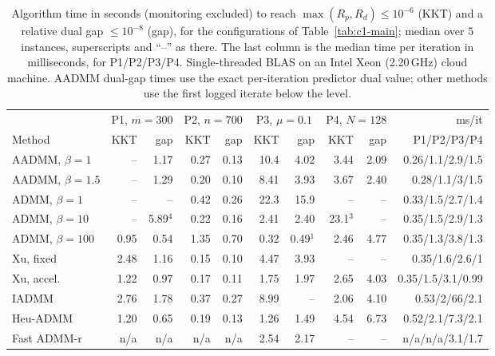 \begin{table}[htbp]
\centering
\caption{Algorithm time in seconds (monitoring excluded) to reach $\max(R_p,R_d)\le10^{-6}$ (KKT) and a relative dual gap $\le10^{-8}$ (gap), for the configurations of Table~\ref{tab:c1-main}; median over $5$ instances, superscripts and ``--'' as there. The last column is the median time per iteration in milliseconds, for P1/P2/P3/P4. Single-threaded BLAS on an Intel Xeon (2.20\,GHz) cloud machine. AADMM dual-gap times use the exact per-iteration predictor dual value; other methods use the first logged iterate below the level.}\label{tab:c1-time}
\scriptsize\setlength{\tabcolsep}{2.4pt}
\begin{tabular}{lrrrrrrrrr}
\toprule
 & \multicolumn{2}{c}{P1, $m{=}300$} & \multicolumn{2}{c}{P2, $n{=}700$} & \multicolumn{2}{c}{P3, $\mu{=}0.1$} & \multicolumn{2}{c}{P4, $N{=}128$} & ms/it \\
\cmidrule(lr){2-3}\cmidrule(lr){4-5}\cmidrule(lr){6-7}\cmidrule(lr){8-9}
Method & KKT & gap & KKT & gap & KKT & gap & KKT & gap & P1/P2/P3/P4 \\
\midrule
AADMM, $\beta{=}1$ & -- & 1.17 & 0.27 & 0.13 & 10.4 & 4.02 & 3.44 & 2.09 & 0.26/1.1/2.9/1.5 \\
AADMM, $\beta{=}1.5$ & -- & 1.29 & 0.20 & 0.10 & 8.41 & 3.93 & 3.67 & 2.40 & 0.28/1.1/3/1.5 \\
\addlinespace[2pt]
ADMM, $\beta{=}1$ & -- & -- & 0.42 & 0.26 & 22.3 & 15.9 & -- & -- & 0.33/1.5/2.7/1.4 \\
ADMM, $\beta{=}10$ & -- & 5.89$^{4}$ & 0.22 & 0.16 & 2.41 & 2.40 & 23.1$^{3}$ & -- & 0.35/1.5/2.9/1.3 \\
ADMM, $\beta{=}100$ & 0.95 & 0.54 & 1.35 & 0.70 & 0.32 & 0.49$^{1}$ & 2.46 & 4.77 & 0.35/1.3/3.8/1.3 \\
\addlinespace[2pt]
Xu, fixed & 2.48 & 1.16 & 0.15 & 0.10 & 4.47 & 3.93 & -- & -- & 0.35/1.6/2.6/1 \\
Xu, accel. & 1.22 & 0.97 & 0.17 & 0.11 & 1.75 & 1.97 & 2.65 & 4.03 & 0.35/1.5/3.1/0.99 \\
IADMM & 2.76 & 1.78 & 0.37 & 0.27 & 8.99 & -- & 2.06 & 4.10 & 0.53/2/66/2.1 \\
Heu-ADMM & 1.20 & 0.65 & 0.19 & 0.13 & 1.26 & 1.49 & 4.54 & 6.73 & 0.52/2.1/7.3/2.1 \\
Fast ADMM-r & n/a & n/a & n/a & n/a & 2.54 & 2.17 & -- & -- & n/a/n/a/3.1/1.7 \\
\bottomrule
\end{tabular}
\end{table}

